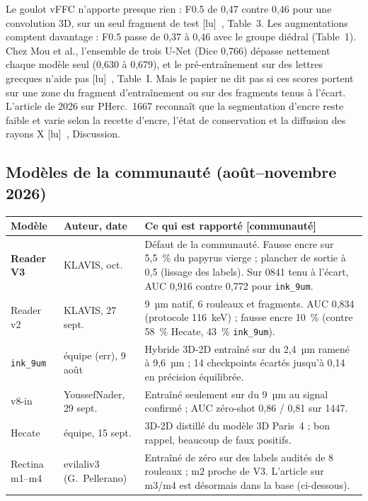 \documentclass[11pt,a4paper]{article}
\newcommand{\lu}{\textsf{\small[lu]}}
\newcommand{\commu}{\textsf{\small[communauté]}}
\newcommand{\pherc}[1]{PHerc.~#1}
\begin{document}
\noindent Le goulot vFFC n'apporte presque rien : F0.5 de 0,47 contre 0,46 pour une convolution
3D, sur un seul fragment de test \lu~\cite{quattrini2023}, Table~3. Les augmentations comptent
davantage : F0.5 passe de 0,37 à 0,46 avec le groupe diédral (Table~1). Chez Mou et al.,
l'ensemble de trois U-Net (Dice 0,766) dépasse nettement chaque modèle seul (0,630 à 0,679),
et le pré-entraînement sur des lettres grecques n'aide pas \lu~\cite{mou2023}, Table~I. Mais
le papier ne dit pas si ces scores portent sur une zone du fragment d'entraînement ou sur des
fragments tenus à l'écart. L'article de 2026 sur
\pherc{1667} reconnaît que la segmentation d'encre reste faible et varie selon la recette
d'encre, l'état de conservation et la diffusion des rayons X \lu~\cite{angelotti2026complete},
Discussion.

\subsection{Modèles de la communauté (août–novembre 2026)}

\begin{longtable}{@{}p{2.4cm}p{3.2cm}p{9.2cm}@{}}
\toprule
Modèle & Auteur, date & Ce qui est rapporté \commu \\
\midrule
\endhead
\textbf{Reader V3} & KLAVIS, oct. & Défaut de la communauté. Fausse encre sur 5,5~\% du papyrus vierge ; plancher de sortie à 0,5 (lissage des labels). Sur 0841 tenu à l'écart, AUC 0,916 contre 0,772 pour \texttt{ink\_9um}. \\
Reader v2 & KLAVIS, 27 sept. & 9~µm natif, 6 rouleaux et fragments. AUC 0,834 (protocole 116~keV) ; fausse encre 10~\% (contre 58~\% Hecate, 43~\% \texttt{ink\_9um}). \\
\texttt{ink\_9um} & équipe (err), 9 août & Hybride 3D-2D entraîné sur du 2,4~µm ramené à 9,6~µm ; 14 checkpoints écartés jusqu'à 0,14 en précision équilibrée. \\
v8-in & YoussefNader, 29 sept. & Entraîné seulement sur du 9~µm au signal confirmé ; AUC zéro-shot 0,86 / 0,81 sur 1447. \\
Hecate & équipe, 15 sept. & 3D-2D distillé du modèle 3D Paris~4 ; bon rappel, beaucoup de faux positifs. \\
Rectina m1–m4 & evilaliv3 (G.~Pellerano) & Entraîné de zéro sur des labels audités de 8 rouleaux ; m2 proche de V3. L'article sur m3/m4 est désormais dans la base (ci-dessous). \\
\bottomrule
\end{longtable}
\end{document}

